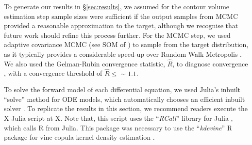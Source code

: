 To generate our results in \S\ref{sec:results}, we assumed for the contour volume estimation step sample sizes were sufficient if the output samples from MCMC provided a reasonable approximation to the target, although we recognise that future work should refine this process further. For the MCMC step, we used adaptive covariance MCMC (see SOM of \cite{johnstone2016uncertainty}) to sample from the target distribution, as it typically provides a considerable speed-up over Random Walk Metropolis \cite{metropolis1953equation,lambert2018Student}. We also used the Gelman-Rubin convergence statistic, $\hat{R}$, to diagnose convergence \cite{lambert2018Student,gelman1992inference}, with a convergence threshold of $\hat{R}\leq\sim 1.1$.

To solve the forward model of each differential equation, we used Julia's inbuilt ``solve'' method for ODE models, which automatically chooses an efficient inbuilt solver \cite{bezanson2017julia}. To replicate the results in this section, we recommend readers execute the X Julia script at X. Note that, this script uses the ``\textit{RCall}'' library for Julia \cite{batesRCall}, which calls \textsf{R} from Julia. This package was necessary to use the ``\textit{kdevine}'' \textsf{R} package for vine copula kernel density estimation \cite{naglerkdevine2018}.
